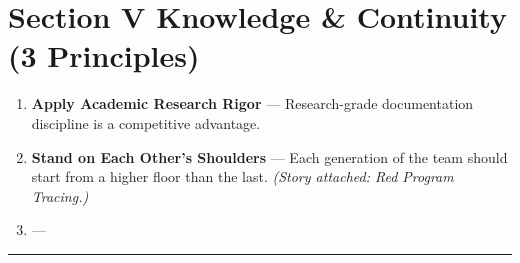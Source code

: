 \documentclass[11pt, letterpaper]{article}
\begin{document}
\vspace{1em}

\section*{\color{principleblue} Section V \quad Knowledge \& Continuity \quad \normalfont\small\color{midgray}(3 Principles)}
\vspace{0.5em}

\begin{enumerate}[leftmargin=2em, label=\textbf{V.\arabic*.}]
  \item \textbf{Apply Academic Research Rigor} ---
        Research-grade documentation discipline is a competitive advantage.
  \item \textbf{Stand on Each Other's Shoulders} ---
        Each generation of the team should start from a higher floor than the last.
        \textit{(Story attached: Red Program Tracing.)}
  \item \textbf{\tbd[Principle 3]} ---
\end{enumerate}

\vspace{2em}
\hrule
\vspace{1em}
\end{document}

